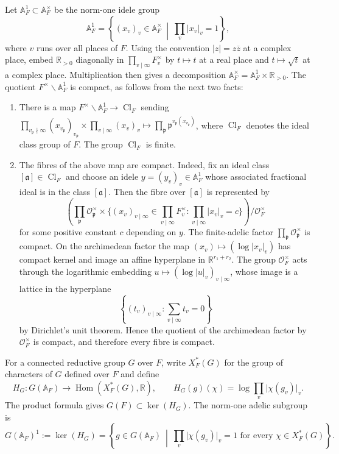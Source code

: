 \documentclass[11pt,a4paper]{article}
\theoremstyle{definition}
\theoremstyle{plain}
\theoremstyle{remark}
\theoremstyle{plain}
\DeclareMathOperator{\Hom}{Hom}
\DeclareMathOperator{\Cl}{Cl}
\begin{document}
Let $\mathbb{A}_F^1\subset\mathbb{A}_F^{\times}$ be the norm-one idele group
$$
    \mathbb{A}_F^1
    =\left\{(x_v)_v\in\mathbb{A}_F^{\times}\ \middle|\
    \prod_v\lvert x_v\rvert_v=1\right\},
$$
where $v$ runs over all places of $F$. Using the convention $\lvert z\rvert=z\overline z$ at a complex place, embed $\mathbb{R}_{>0}$ diagonally in $\prod_{v\mid\infty}F_v^{\times}$ by $t\mapsto t$ at a real place and $t\mapsto\sqrt t$ at a complex place. Multiplication then gives a decomposition $\mathbb{A}_F^{\times}=\mathbb{A}_F^1\times\mathbb{R}_{>0}$. The quotient $F^{\times}\backslash\mathbb{A}_F^1$ is compact, as follows from the next two facts:
\begin{enumerate}
\item There is a map $F^{\times}\backslash\mathbb{A}_F^1 \xrightarrow[]{} \Cl_F$ sending $\prod_{v_{\mathfrak{p}} \nmid \infty} (x_{v_{\mathfrak{p}}})_{v_{\mathfrak{p}}} \times \prod_{v \mid \infty}(x_v)_v \mapsto \prod_{\mathfrak{p}} \mathfrak{p}^{v_{\mathfrak{p}}(x_{v_{\mathfrak{p}}})}$, where $\Cl_F$ denotes the ideal class group of $F$. The group $\Cl_F$ is finite.
\item The fibres of the above map are compact. Indeed, fix an ideal class $[\mathfrak a]\in \Cl_F$ and choose an idele $y=(y_v)_v\in \mathbb A_F^1$ whose associated fractional ideal is in the class $[\mathfrak a]$. Then the fibre over $[\mathfrak a]$ is represented by
$$
(\prod_{\mathfrak p} \mathcal O_{\mathfrak p}^{\times} \times \{(x_v)_{v\mid\infty}\in \prod_{v\mid\infty}F_v^\times: \prod_{v\mid\infty}\lvert x_v\rvert_v = c \}) / \mathcal O_F^\times $$
for some positive constant $c$ depending on $y$. The finite-adelic factor $\prod_{\mathfrak p}\mathcal O_{\mathfrak p}^{\times}$ is compact. On the archimedean factor the map $(x_v)\mapsto(\log\lvert x_v\rvert_v)$ has compact kernel and image an affine hyperplane in $\mathbb R^{r_1+r_2}$. The group $\mathcal O_F^\times$ acts through the logarithmic embedding $u\mapsto(\log\lvert u\rvert_v)_{v\mid\infty}$, whose image is a lattice in the hyperplane
$$
    \left\{(t_v)_{v\mid\infty}:\sum_{v\mid\infty}t_v=0\right\}
$$
by Dirichlet's unit theorem. Hence the quotient of the archimedean factor by $\mathcal O_F^\times$ is compact, and therefore every fibre is compact.
\end{enumerate}

For a connected reductive group $G$ over $F$, write $X_F^*(G)$ for the group of characters of $G$ defined over $F$ and define
$$
    H_G:G(\mathbb{A}_F)\longrightarrow\Hom(X_F^*(G),\mathbb{R}),
    \qquad
    H_G(g)(\chi)=\log\prod_v\lvert\chi(g_v)\rvert_v.
$$
The product formula gives $G(F)\subset\ker(H_G)$. The norm-one adelic subgroup is
$$
    G(\mathbb{A}_F)^1:=\ker(H_G)
    =\left\{g\in G(\mathbb{A}_F)\ \middle|\
    \prod_v\lvert\chi(g_v)\rvert_v=1
    \text{ for every }\chi\in X_F^*(G)\right\}.
$$
\end{document}
